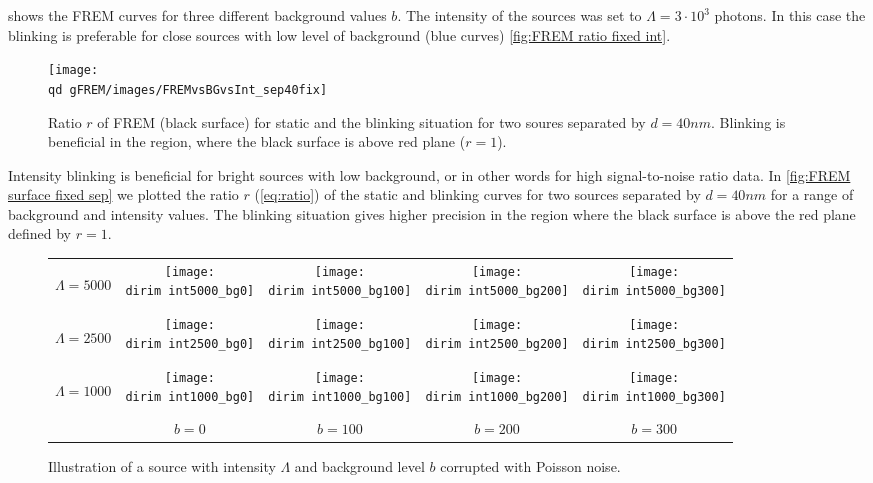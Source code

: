  shows the FREM curves for three different background values $b$. The intensity of the sources was set to $\Lambda =3\cdot 10^3$ photons. In this case the blinking is preferable for close sources with low level of background (blue curves) \autoref{fig:FREM ratio fixed int}. 

\begin{figure}[!hbt]
	\centering
	\newcommand{\wf}{.8\textwidth}
	\texttt{[image: \\qd gFREM/images/FREMvsBGvsInt\_sep40fix]}
	\caption{Ratio $r$ of FREM (black surface) for static and the blinking situation for two soures separated by $d=40\unit{nm}$. Blinking is beneficial in the region, where the black surface is above red plane ($r=1$).}
	\label{fig:FREM surface fixed sep}
\end{figure}
%
Intensity blinking is beneficial for bright sources with low background, or in other words for high signal-to-noise ratio data. In \autoref{fig:FREM surface fixed sep} we plotted the ratio $r$ (\autoref{eq:ratio}) of the static and blinking curves for two sources separated by $d=40\unit{nm}$ for a range of background and intensity values. The blinking situation gives higher precision in the region where the black surface is above the red plane defined by $r=1$. 


\begin{figure}[!hbt]
	\centering
	\newcommand{\wf}{.2\textwidth}
	\newcommand{\dirim}{\qd gFREM/images/psf/}
	\newcommand{\vs}{.5}
	\begin{tabular}{|ccccc}
		\begin{sideways}\hspace{\vs cm}$\Lambda=5000$\end{sideways}
		&\texttt{[image: \\dirim int5000\_bg0]}
		&\texttt{[image: \\dirim int5000\_bg100]}
		&\texttt{[image: \\dirim int5000\_bg200]}
		&\texttt{[image: \\dirim int5000\_bg300]}\\
		\begin{sideways}\hspace{\vs cm}$\Lambda=2500$\end{sideways}
		&\texttt{[image: \\dirim int2500\_bg0]}
		&\texttt{[image: \\dirim int2500\_bg100]}
		&\texttt{[image: \\dirim int2500\_bg200]}
		&\texttt{[image: \\dirim int2500\_bg300]}\\
		\begin{sideways}\hspace{\vs cm}$\Lambda=1000$\end{sideways}
		&\texttt{[image: \\dirim int1000\_bg0]}
		&\texttt{[image: \\dirim int1000\_bg100]}
		&\texttt{[image: \\dirim int1000\_bg200]}
		&\texttt{[image: \\dirim int1000\_bg300]}\\
		&$b=0$ & $b=100$ & $b=200$ & $b=300$\\
		\hline	
	\end{tabular}
	\caption{Illustration of a source with intensity $\Lambda$ and background level $b$ corrupted with Poisson noise.}
	\label{fig:PSF int bg}
\end{figure}

